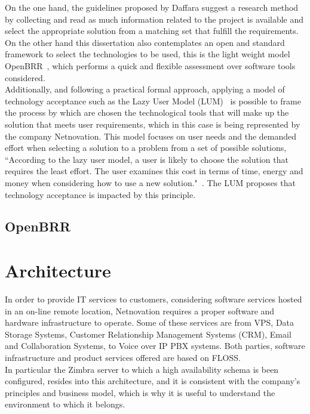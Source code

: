 \documentclass[a4paper, 12pt]{book}
\begin{document}
\noindent On the one hand, the guidelines proposed by Daffara suggest a research method by collecting and read as much information related to the project is available and select the appropriate solution from a matching set that fulfill the requirements. On the other hand this dissertation also contemplates an open and standard framework to select the technologies to be used, this is the light weight model OpenBRR~\cite{Wasserman et. all}, which performs a quick and flexible assessment over software tools considered.\\

\noindent Additionally, and following a practical formal approach, applying a model of technology acceptance such as the Lazy User Model (LUM)~\cite{Collan and Tetard} is possible to frame the process by which are chosen the technological tools that will make up the solution that meets user requirements, which in this case is being represented by the company Netnovation. This model focuses on user needs and the demanded effort when selecting a solution to a problem from a set of possible solutions, ``According to the lazy user model, a user is likely to choose the solution that requires the least effort. The user examines this cost in terms of time, energy and money when considering how to use a new solution."~\cite{Collan and Tetard LUM PS}. The LUM proposes that technology acceptance is impacted by this principle.


\section{OpenBRR}
\label{sec:openbrr}




%
\chapter{Architecture}
\label{chap:architecture}

In order to provide IT services to customers, considering software services hosted in an on-line remote location, Netnovation requires a proper software and hardware infrastructure to operate. Some of these services are from VPS, Data Storage Systems, Customer Relationship Management Systems (CRM), Email and Collaboration Systems, to Voice over IP PBX systems. Both parties, software infrastructure and product services offered are based on FLOSS.\\

\noindent In particular the Zimbra server to which a high availability schema is been configured, resides into this architecture, and it is consistent with the company's principles and business model, which is why it is useful to understand the environment to which it belongs.
\end{document}
